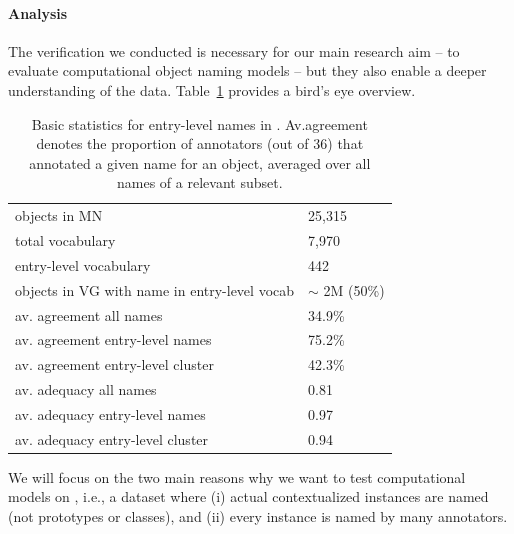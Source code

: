 

\paragraph{Analysis}
\label{sect:mn_analysis}

The verification we conducted is necessary for our main research aim -- to evaluate computational object naming models -- but they also enable a deeper understanding of the \mn data.
Table~\ref{tab:stat-entry-level} provides a bird's eye overview.
\begin{table}[t]
	\centering
	\small
	\begin{tabular}{p{5cm}l}
		\toprule		
		objects in MN & 25,315\\
		total vocabulary &  7,970\\
		entry-level vocabulary & 442\\
		objects in VG with name in entry-level vocab & $\sim$ 2M (50\%)\\
		\midrule
		av. agreement all names & 34.9\%\\
		av. agreement entry-level names & 75.2\%\\
		av. agreement entry-level cluster & 42.3\%\\
		\midrule
		av. adequacy all names & 0.81\\
		av. adequacy entry-level names & 0.97 \\
		av. adequacy entry-level cluster & 0.94 \\
		\bottomrule	
	\end{tabular}
	\caption{Basic statistics for entry-level names in \mn. Av.agreement denotes the proportion of annotators (out of 36) that annotated a given name for an object, averaged over all names of a relevant subset.}
	\label{tab:stat-entry-level}
\end{table}
We will focus on the two main reasons why we want to test computational models on \mn, i.e., a dataset where (i) actual contextualized instances are named (not prototypes or classes), and (ii) every instance is named by many annotators.

